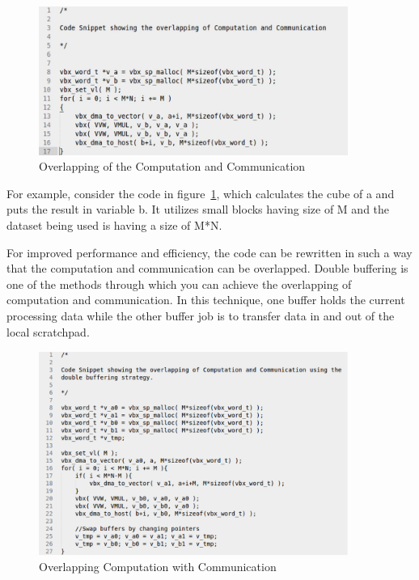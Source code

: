 \begin{figure}
	\centering
	\includegraphics[width=0.9\textwidth]{images/c1.png}
	\caption{Overlapping of the Computation and Communication}
	\label{c1:mat}
\end{figure}

For example, consider the code in figure~\ref{c1:mat}, which calculates the cube of a and puts the result in variable b. It utilizes small blocks having size of M and the dataset being used is having a size of M*N.

For improved performance and efficiency, the code can be rewritten in such a way that the computation and communication can be overlapped. Double buffering is one of the methods through which you can achieve the overlapping of computation and communication. In this technique, one buffer holds the current processing data while the other buffer job is to transfer data in and out of the local scratchpad.

\begin{figure}
	\centering
	\includegraphics[width=0.9\textwidth]{images/c2.png}
	\caption{Overlapping Computation with Communication}
	\label{c2:mat}
\end{figure}

